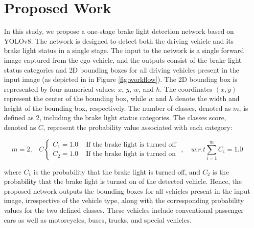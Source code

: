 \section{Proposed Work}
\label{sec:proposed}

In this study, we propose a one-stage brake light detection network based on YOLOv8. The network is designed to detect both the driving vehicle and its brake light status in a single stage. 
The input to the network is a single forward image captured from the ego-vehicle, and the outputs consist of the brake light status categories and 2D bounding boxes for all driving vehicles present in the input image (as depicted in in Figure \ref{fig:workflow}).
The 2D bounding box is represented by four numerical values: $x$, $y$, $w$, and $h$. The coordinates $(x,y)$ represent the center of the bounding box, while $w$ and $h$ denote the width and height of the bounding box, respectively. 
The number of classes, denoted as $m$, is defined as $2$, including the brake light status categories.
The classes score, denoted as $C$, represent the probability value associated with each category:

\begin{equation}
    m=2, \;\;\; C   \begin{cases}
        C_{1}=1.0 & \text{ If the brake light is turned off } \\
        C_{2}=1.0 & \text{ If the brake light is turned on }
        \end{cases}
        , \quad w.r.t \sum_{i=1}^{m}{C_{i}}=1.0
\end{equation}

where $C_{1}$ is the probability that the brake light is turned off, and $C_{2}$ is the probability that the brake light is turned on of the detected vehicle.
Hence, the proposed network outputs the bounding boxes for all vehicles present in the input image, irrespective of the vehicle type, along with the corresponding probability values for the two defined classes.
These vehicles include conventional passenger cars as well as motorcycles, buses, trucks, and special vehicles.


